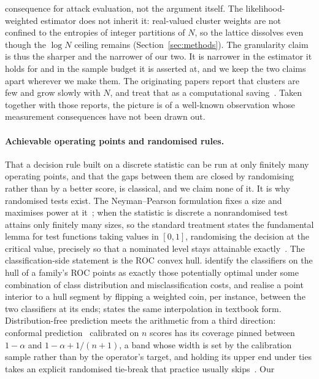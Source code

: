 consequence for attack evaluation, not the argument itself. The
likelihood-weighted estimator does not inherit it: real-valued cluster weights are not
confined to the entropies of integer partitions of $N$, so the lattice dissolves even though
the $\log N$ ceiling remains (Section~\ref{sec:methods}). The granularity claim is thus the
sharper and the narrower of our two. It is narrower in the estimator it holds for and in the
sample budget it is asserted at, and we keep the two claims apart wherever we make them. The
originating papers report that clusters are few and grow slowly with $N$, and treat that as a
computational saving~\citep{kuhn2023semantic, farquhar2024detecting}. Taken together with
those reports, the picture is of a well-known observation whose measurement consequences have
not been drawn out.

\paragraph{Achievable operating points and randomised rules.}
That a decision rule built on a discrete statistic can be run at only finitely many operating
points, and that the gaps between them are closed by randomising rather than by a better
score, is classical, and we claim none of it. It is why randomised tests exist. The
Neyman--Pearson formulation fixes a size and maximises power at
it~\citep{neyman1933testing}; when the statistic is discrete a nonrandomised test attains only
finitely many sizes, so the standard treatment states the fundamental lemma for test functions
taking values in $[0,1]$, randomising the decision at the critical value, precisely so that a
nominated level stays attainable exactly~\citep{lehmann2005testing}. The classification-side
statement is the ROC convex hull. \citet{provost2001robust} identify the classifiers on the
hull of a family's ROC points as exactly those potentially optimal under some combination of
class distribution and misclassification costs, and realise a point interior to a hull segment
by flipping a weighted coin, per instance, between the two classifiers at its ends;
\citet{fawcett2006roc} states the same interpolation in textbook form. Distribution-free
prediction meets the arithmetic from a third direction: conformal
prediction~\citep{vovk2005algorithmic} calibrated on $n$ scores has its coverage pinned
between $1-\alpha$ and $1-\alpha+1/(n{+}1)$, a band whose width is set by the calibration
sample rather than by the operator's target, and holding its upper end under ties takes an
explicit randomised tie-break that practice usually skips~\citep{angelopoulos2021gentle}. Our
